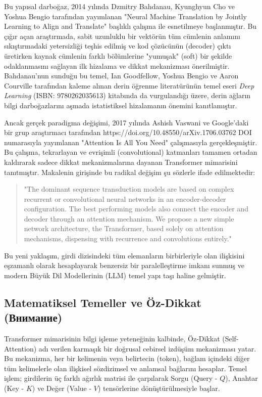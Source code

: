 \documentclass[11pt,a4paper]{article}
\begin{document}
Bu yapısal darboğaz, 2014 yılında Dzmitry Bahdanau, Kyunghyun Cho ve Yoshua Bengio tarafından yayımlanan "Neural Machine Translation by Jointly Learning to Align and Translate" başlıklı çalışma ile esnetilmeye başlanmıştır. Bu çığır açan araştırmada, sabit uzunluklu bir vektörün tüm cümlenin anlamını sıkıştırmadaki yetersizliği teşhis edilmiş ve kod çözücünün (decoder) çıktı üretirken kaynak cümlenin farklı bölümlerine "yumuşak" (soft) bir şekilde odaklanmasını sağlayan ilk hizalama ve dikkat mekanizması önerilmiştir. Bahdanau'nun sunduğu bu temel, Ian Goodfellow, Yoshua Bengio ve Aaron Courville tarafından kaleme alınan derin öğrenme literatürünün temel eseri \textit{Deep Learning} (ISBN: 9780262035613) kitabında da vurgulandığı üzere, derin ağların bilgi darboğazlarını aşmada istatistiksel hizalamanın önemini kanıtlamıştır.

Ancak gerçek paradigma değişimi, 2017 yılında Ashish Vaswani ve Google'daki bir grup araştırmacı tarafından https://doi.org/10.48550/arXiv.1706.03762 DOI numarasıyla yayımlanan "Attention Is All You Need" çalışmasıyla gerçekleşmiştir. Bu çalışma, tekrarlayan ve evrişimli (convolutional) katmanları tamamen ortadan kaldırarak sadece dikkat mekanizmalarına dayanan Transformer mimarisini tanıtmıştır. Makalenin girişinde bu radikal değişim şu sözlerle ifade edilmektedir:

\begin{quote}
"The dominant sequence transduction models are based on complex recurrent or convolutional neural networks in an encoder-decoder configuration. The best performing models also connect the encoder and decoder through an attention mechanism. We propose a new simple network architecture, the Transformer, based solely on attention mechanisms, dispensing with recurrence and convolutions entirely."
\end{quote}
Bu yeni yaklaşım, girdi dizisindeki tüm elemanların birbirleriyle olan ilişkisini eşzamanlı olarak hesaplayarak benzersiz bir paralelleştirme imkanı sunmuş ve modern Büyük Dil Modellerinin (LLM) temel yapı taşı haline gelmiştir.

\subsection{Matematiksel Temeller ve Öz-Dikkat (Внимание)}
Transformer mimarisinin bilgi işleme yeteneğinin kalbinde, Öz-Dikkat (Self-Attention) adı verilen karmaşık bir doğrusal cebirsel izdüşüm mekanizması yatar. Bu mekanizma, her bir kelimenin veya belirtecin (token), bağlam içindeki diğer tüm kelimelerle olan ilişkisel sözdizimsel ve anlamsal bağlarını hesaplar. Temel işlem; girdilerin üç farklı ağırlık matrisi ile çarpılarak Sorgu (Query - \(Q\)), Anahtar (Key - \(K\)) ve Değer (Value - \(V\)) tensörlerine dönüştürülmesiyle başlar.
\end{document}
